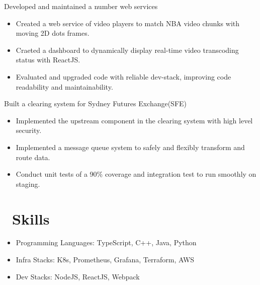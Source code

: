 \documentclass{resume}
\begin{document}
Developed and maintained a number web services
\begin{itemize}
  \item Created a web service of video players to match NBA video chunks with moving 2D dots frames.
  \item Craeted a dashboard to dynamically display real-time video transcoding status with ReactJS.
  \item Evaluated and upgraded code with reliable dev-stack, improving code readability and maintainability.
\end{itemize}

Built a clearing system for Sydney Futures Exchange(SFE)
\begin{itemize}
  \item Implemented the upstream component in the clearing system with high level security.
  \item Implemented a message queue system to safely and flexibly transform and route data.
  \item Conduct unit tests of a 90\% coverage and integration test to run smoothly on staging.
\end{itemize}


\section{\faCogs\ Skills}
\begin{itemize}[parsep=0.5ex]
  \item Programming Languages: TypeScript, C++, Java, Python
  \item Infra Stacks: K8s, Prometheus, Grafana, Terraform, AWS
  \item Dev Stacks: NodeJS, ReactJS, Webpack
\end{itemize}

\end{document}
